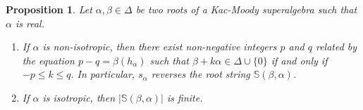 \documentclass[11pt,reqno]{amsart}
\theoremstyle{plain}
\newtheorem*{prop}{Proposition}
\theoremstyle{definition}
\theoremstyle{remark}
\numberwithin{equation}{section}
\begin{document}
\begin{prop}\label{unbrokenrs}
Let $\alpha,\beta\in \Delta$ be two roots of a Kac-Moody superalgebra such that $\alpha$ is real.

\begin{enumerate}
    \item  If $\alpha$ is non-isotropic, then there exist non-negative integers $p$ and $q$ related by the equation $p-q=\beta(h_\alpha)$ such that $\beta+k\alpha\in \Delta\cup \{0\}$ if and only if $-p\le k\le q.$ In particular, $s_\alpha$ reverses the root string $\mathbb{S}(\beta,\alpha)$. \vspace{0,1cm}
    \item If $\alpha$ is isotropic, then $|\mathbb{S}(\beta,\alpha)|$ is finite.
\end{enumerate}
\end{prop}
\end{document}

